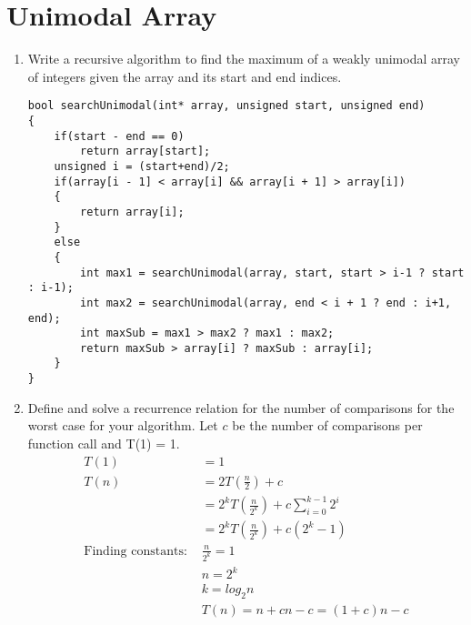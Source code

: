 \documentclass[11pt]{article}
\begin{document}
    \section{Unimodal Array}
    \begin{enumerate}
        \item Write a recursive algorithm to find the maximum of a weakly unimodal array of integers given the array and its start and end indices.
\begin{verbatim}
bool searchUnimodal(int* array, unsigned start, unsigned end)
{
    if(start - end == 0)
        return array[start];
    unsigned i = (start+end)/2;
    if(array[i - 1] < array[i] && array[i + 1] > array[i])
    {
        return array[i];
    }
    else
    {
        int max1 = searchUnimodal(array, start, start > i-1 ? start : i-1);
        int max2 = searchUnimodal(array, end < i + 1 ? end : i+1, end);
        int maxSub = max1 > max2 ? max1 : max2;
        return maxSub > array[i] ? maxSub : array[i];
    }
}
\end{verbatim}
        \item Define and solve a recurrence relation for the number of comparisons for the worst case for your algorithm. Let $c$ be the number of comparisons per function call and T(1) = 1.\\
        \begin{equation}
        \begin{split}
                    T(1) & = 1\\
                    T(n) & = 2T(\frac{n}{2}) + c \\
                    & = 2^kT(\frac{n}{2^k}) + c\sum\limits_{i=0}^{k-1} 2^i \\
                    & = 2^kT(\frac{n}{2^k}) + c(2^k - 1)\\
                    \text{Finding constants: } & \frac{n}{2^k} = 1 \\
                    & n = 2^k \\
                    & k = log_2 n \\
                    & T(n) = n + cn - c = (1 + c)n - c \\
                \end{split}
        \end{equation}
    \end{enumerate}
    \label{r:lastpage}
    
\end{document}
